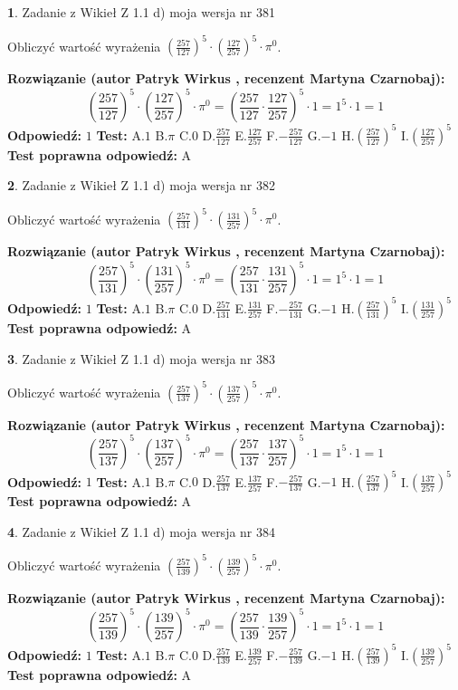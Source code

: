 \documentclass[12pt, a4paper]{article}
\theoremstyle{definition} %
\newtheorem{zad}{}
\newcommand{\zadStart}[1]{\begin{zad}#1\newline}
\newcommand{\zadStop}{\end{zad}}
\newcommand{\rozwStart}[2]{\noindent \textbf{Rozwiązanie (autor #1 , recenzent #2): }\newline}
\newcommand{\rozwStop}{\newline}
\newcommand{\odpStart}{\noindent \textbf{Odpowiedź:}\newline}
\newcommand{\odpStop}{\newline}
\newcommand{\testStart}{\noindent \textbf{Test:}\newline}
\newcommand{\testStop}{\newline}
\newcommand{\kluczStart}{\noindent \textbf{Test poprawna odpowiedź:}\newline}
\newcommand{\kluczStop}{\newline}
\begin{document}
\zadStart{Zadanie z Wikieł Z 1.1 d) moja wersja nr 381}

Obliczyć wartość wyrażenia $(\frac{257}{127})^{5} \cdot (\frac{127}{257})^{5} \cdot \pi^{0}$.
\zadStop
\rozwStart{Patryk Wirkus}{Martyna Czarnobaj}
$$(\frac{257}{127})^{5} \cdot (\frac{127}{257})^{5} \cdot \pi^{0} = (\frac{257}{127} \cdot \frac{127}{257})^{5} \cdot 1 = 1^{5} \cdot 1 = 1$$
\rozwStop
\odpStart
$1$
\odpStop
\testStart
A.$1$ B.$\pi$ C.$0$ D.$\frac{257}{127}$ E.$\frac{127}{257}$
F.$-\frac{257}{127}$ G.$-1$
H.$(\frac{257}{127})^{5}$
I.$(\frac{127}{257})^{5}$
\testStop
\kluczStart
A
\kluczStop



\zadStart{Zadanie z Wikieł Z 1.1 d) moja wersja nr 382}

Obliczyć wartość wyrażenia $(\frac{257}{131})^{5} \cdot (\frac{131}{257})^{5} \cdot \pi^{0}$.
\zadStop
\rozwStart{Patryk Wirkus}{Martyna Czarnobaj}
$$(\frac{257}{131})^{5} \cdot (\frac{131}{257})^{5} \cdot \pi^{0} = (\frac{257}{131} \cdot \frac{131}{257})^{5} \cdot 1 = 1^{5} \cdot 1 = 1$$
\rozwStop
\odpStart
$1$
\odpStop
\testStart
A.$1$ B.$\pi$ C.$0$ D.$\frac{257}{131}$ E.$\frac{131}{257}$
F.$-\frac{257}{131}$ G.$-1$
H.$(\frac{257}{131})^{5}$
I.$(\frac{131}{257})^{5}$
\testStop
\kluczStart
A
\kluczStop



\zadStart{Zadanie z Wikieł Z 1.1 d) moja wersja nr 383}

Obliczyć wartość wyrażenia $(\frac{257}{137})^{5} \cdot (\frac{137}{257})^{5} \cdot \pi^{0}$.
\zadStop
\rozwStart{Patryk Wirkus}{Martyna Czarnobaj}
$$(\frac{257}{137})^{5} \cdot (\frac{137}{257})^{5} \cdot \pi^{0} = (\frac{257}{137} \cdot \frac{137}{257})^{5} \cdot 1 = 1^{5} \cdot 1 = 1$$
\rozwStop
\odpStart
$1$
\odpStop
\testStart
A.$1$ B.$\pi$ C.$0$ D.$\frac{257}{137}$ E.$\frac{137}{257}$
F.$-\frac{257}{137}$ G.$-1$
H.$(\frac{257}{137})^{5}$
I.$(\frac{137}{257})^{5}$
\testStop
\kluczStart
A
\kluczStop



\zadStart{Zadanie z Wikieł Z 1.1 d) moja wersja nr 384}

Obliczyć wartość wyrażenia $(\frac{257}{139})^{5} \cdot (\frac{139}{257})^{5} \cdot \pi^{0}$.
\zadStop
\rozwStart{Patryk Wirkus}{Martyna Czarnobaj}
$$(\frac{257}{139})^{5} \cdot (\frac{139}{257})^{5} \cdot \pi^{0} = (\frac{257}{139} \cdot \frac{139}{257})^{5} \cdot 1 = 1^{5} \cdot 1 = 1$$
\rozwStop
\odpStart
$1$
\odpStop
\testStart
A.$1$ B.$\pi$ C.$0$ D.$\frac{257}{139}$ E.$\frac{139}{257}$
F.$-\frac{257}{139}$ G.$-1$
H.$(\frac{257}{139})^{5}$
I.$(\frac{139}{257})^{5}$
\testStop
\kluczStart
A
\kluczStop
\end{document}
